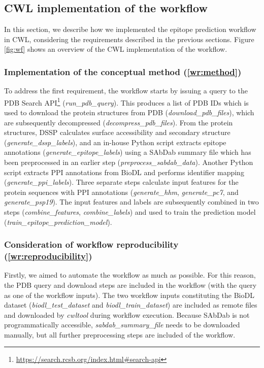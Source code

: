 \subsection{CWL implementation of the workflow}
\label{sec:wf_implementation}

In this section, we describe how we implemented the epitope prediction workflow in CWL, considering the requirements described in the previous sections. Figure \ref{fig:wf} shows an overview of the CWL implementation of the workflow.

\subsubsection{Implementation of the conceptual method (\ref{wr:method})}

To address the first requirement, the workflow starts by issuing a query to the PDB Search API\footnote{\url{https://search.rcsb.org/index.html\#search-api}} (\emph{run\_pdb\_query}). This produces a list of PDB IDs which is used to download the protein structures from PDB (\emph{download\_pdb\_files}), which are subsequently decompressed (\emph{decompress\_pdb\_files}). From the protein structures, DSSP calculates surface accessibility and secondary structure (\emph{generate\_dssp\_labels}), and an in-house Python script extracts epitope annotations (\emph{generate\_epitope\_labels}) using a SAbDab summary file which has been preprocessed in an earlier step (\emph{preprocess\_sabdab\_data}). Another Python script extracts PPI annotations from BioDL and performs identifier mapping (\emph{generate\_ppi\_labels}). Three separate steps calculate input features for the protein sequences with PPI annotations (\emph{generate\_hhm}, \emph{generate\_pc7}, and \emph{generate\_psp19}). The input features and labels are subsequently combined in two steps  (\emph{combine\_features}, \emph{combine\_labels}) and used to train the prediction model (\emph{train\_epitope\_prediction\_model}).

\subsubsection{Consideration of workflow reproducibility  (\ref{wr:reproducibility})} 
Firstly, we aimed to automate the workflow as much as possible. For this reason, the PDB query and download steps are included in the workflow (with the query as one of the workflow inputs). The two workflow inputs constituting the BioDL dataset (\emph{biodl\_test\_dataset} and \emph{biodl\_train\_dataset}) are included as remote files and downloaded by \emph{cwltool} during workflow execution. 
Because SAbDab is not programmatically accessible, \emph{sabdab\_summary\_file} needs to be downloaded manually, but all further preprocessing steps are included of the workflow. 

